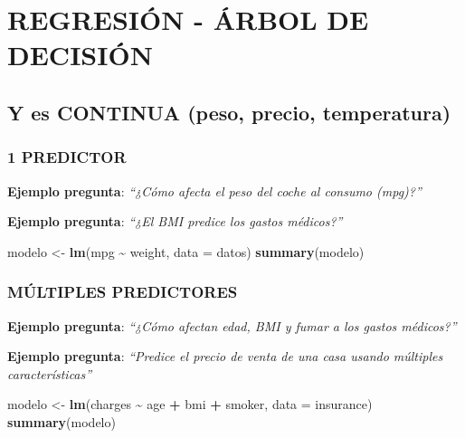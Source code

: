 \documentclass[
  10pt,
]{article}
\newenvironment{Shaded}{\begin{snugshade}}{\end{snugshade}}
\newcommand{\AttributeTok}[1]{\textcolor[rgb]{0.13,0.29,0.53}{#1}}
\newcommand{\FunctionTok}[1]{\textcolor[rgb]{0.13,0.29,0.53}{\textbf{#1}}}
\newcommand{\NormalTok}[1]{#1}
\newcommand{\OtherTok}[1]{\textcolor[rgb]{0.56,0.35,0.01}{#1}}
\newcommand{\SpecialCharTok}[1]{\textcolor[rgb]{0.81,0.36,0.00}{\textbf{#1}}}
\begin{document}
\newpage

\section{REGRESIÓN - ÁRBOL DE
DECISIÓN}\label{regresiuxf3n---uxe1rbol-de-decisiuxf3n}

\subsection{Y es CONTINUA (peso, precio,
temperatura)}\label{y-es-continua-peso-precio-temperatura}

\subsubsection{1 PREDICTOR}\label{predictor}

\textbf{Ejemplo pregunta}: \emph{``¿Cómo afecta el peso del coche al
consumo (mpg)?''}

\textbf{Ejemplo pregunta}: \emph{``¿El BMI predice los gastos
médicos?''}

\begin{Shaded}
\begin{Highlighting}[]
\NormalTok{modelo }\OtherTok{\textless{}{-}} \FunctionTok{lm}\NormalTok{(mpg }\SpecialCharTok{\textasciitilde{}}\NormalTok{ weight, }\AttributeTok{data =}\NormalTok{ datos)}
\FunctionTok{summary}\NormalTok{(modelo)}
\end{Highlighting}
\end{Shaded}

\subsubsection{MÚLTIPLES PREDICTORES}\label{muxfaltiples-predictores}

\textbf{Ejemplo pregunta}: \emph{``¿Cómo afectan edad, BMI y fumar a los
gastos médicos?''}

\textbf{Ejemplo pregunta}: \emph{``Predice el precio de venta de una
casa usando múltiples características''}

\begin{Shaded}
\begin{Highlighting}[]
\NormalTok{modelo }\OtherTok{\textless{}{-}} \FunctionTok{lm}\NormalTok{(charges }\SpecialCharTok{\textasciitilde{}}\NormalTok{ age }\SpecialCharTok{+}\NormalTok{ bmi }\SpecialCharTok{+}\NormalTok{ smoker, }\AttributeTok{data =}\NormalTok{ insurance)}
\FunctionTok{summary}\NormalTok{(modelo)}
\end{Highlighting}
\end{Shaded}
\end{document}
